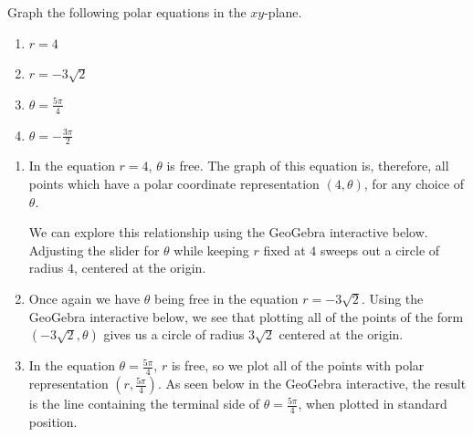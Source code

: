\documentclass{ximera}
\begin{document}
\begin{example} \label{rthetaconstant} Graph the following polar equations in the $xy$-plane.
\begin{enumerate}

\item  $r = 4$

\item  $r = -3\sqrt{2}$

\item  $\theta = \frac{5\pi}{4}$

\item  $\theta = -\frac{3\pi}{2}$

\end{enumerate}

\begin{explanation}

\begin{enumerate}

\item  In the equation $r=4$, $\theta$ is free.  The graph of this equation is, therefore,  all points which have a polar coordinate representation $(4,\theta)$, for any choice of $\theta$. 

We can explore this relationship using the GeoGebra interactive below.  Adjusting the slider for $\theta$ while keeping $r$ fixed at $4$ sweeps out a circle of radius $4$, centered at the origin.

\begin{center}
\end{center}


\item  Once again we have $\theta$ being free in the equation $r = -3\sqrt{2}$.  Using the GeoGebra interactive below, we see that plotting all of the points of the form $(-3\sqrt{2}, \theta)$ gives us a circle of radius $3\sqrt{2}$ centered at the origin. 

\begin{center}
\end{center}

\item  In the equation $\theta = \frac{5\pi}{4}$, $r$ is free, so we plot all of the points with polar representation $\left(r, \frac{5\pi}{4}\right)$.  As seen below in the GeoGebra interactive, the result is the line containing the terminal side of $\theta = \frac{5\pi}{4}$, when plotted in standard position.


\end{enumerate}
\end{explanation}
\end{example}
\end{document}
